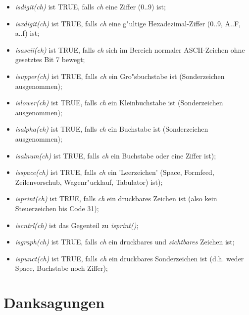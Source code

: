 \documentclass[12pt,a4paper,twoside]{report}
\begin{document}
\begin{itemize}
\item{{\em isdigit(ch)} ist TRUE, falls {\em ch} eine Ziffer (0..9)
      ist;}
\item{{\em isxdigit(ch)} ist TRUE, falls {\em ch} eine g"ultige
      Hexadezimal-Ziffer (0..9, A..F, a..f) ist;}
\item{{\em isascii(ch)} ist TRUE, falls {\em ch} sich im Bereich
      normaler ASCII-Zeichen ohne gesetztes Bit 7 bewegt;}
\item{{\em isupper(ch)} ist TRUE, falls {\em ch} ein Gro"sbuchstabe
      ist (Sonderzeichen ausgenommen);}
\item{{\em islower(ch)} ist TRUE, falls {\em ch} ein Kleinbuchstabe
      ist (Sonderzeichen ausgenommen);}
\item{{\em isalpha(ch)} ist TRUE, falls {\em ch} ein Buchstabe ist
      (Sonderzeichen ausgenommen);}
\item{{\em isalnum(ch)} ist TRUE, falls {\em ch} ein Buchstabe oder
      eine Ziffer ist);}
\item{{\em isspace(ch)} ist TRUE, falls {\em ch} ein 'Leerzeichen'
      (Space, Formfeed, Zeilenvorschub, Wagenr"ucklauf, Tabulator)
      ist);}
\item{{\em isprint(ch)} ist TRUE, falls {\em ch} ein druckbares
      Zeichen ist (also kein Steuerzeichen bis Code 31);}
\item{{\em iscntrl(ch)} ist das Gegenteil zu {\em isprint()};}
\item{{\em isgraph(ch)} ist TRUE, falls {\em ch} ein druckbares
      und {\it sichtbares} Zeichen ist;}
\item{{\em ispunct(ch)} ist TRUE, falls {\em ch} ein druckbares
      Sonderzeichen ist (d.h. weder Space, Buchstabe noch Ziffer);}
\end{itemize}


\cleardoublepage
\chapter{Danksagungen}
\end{document}
